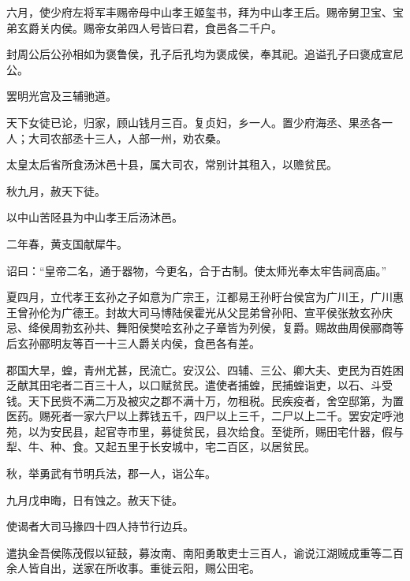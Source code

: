 \documentclass[12pt,UTF8]{ctexbook}
\begin{document}
六月，使少府左将军丰赐帝母中山孝王姬玺书，拜为中山孝王后。赐帝舅卫宝、宝弟玄爵关内侯。赐帝女弟四人号皆曰君，食邑各二千户。



封周公后公孙相如为褒鲁侯，孔子后孔均为褒成侯，奉其祀。追谥孔子曰褒成宣尼公。



罢明光宫及三辅驰道。



天下女徒已论，归家，顾山钱月三百。复贞妇，乡一人。置少府海丞、果丞各一人；大司农部丞十三人，人部一州，劝农桑。



太皇太后省所食汤沐邑十县，属大司农，常别计其租入，以赡贫民。



秋九月，赦天下徒。



以中山苦陉县为中山孝王后汤沐邑。



二年春，黄支国献犀牛。



诏曰：“皇帝二名，通于器物，今更名，合于古制。使太师光奉太牢告祠高庙。”



夏四月，立代孝王玄孙之子如意为广宗王，江都易王孙盱台侯宫为广川王，广川惠王曾孙伦为广德王。封故大司马博陆侯霍光从父昆弟曾孙阳、宣平侯张敖玄孙庆忌、绛侯周勃玄孙共、舞阳侯樊哙玄孙之子章皆为列侯，复爵。赐故曲周侯郦商等后玄孙郦明友等百一十三人爵关内侯，食邑各有差。



郡国大旱，蝗，青州尤甚，民流亡。安汉公、四辅、三公、卿大夫、吏民为百姓困乏献其田宅者二百三十人，以口赋贫民。遣使者捕蝗，民捕蝗诣吏，以石、斗受钱。天下民赀不满二万及被灾之郡不满十万，勿租税。民疾疫者，舍空邸第，为置医药。赐死者一家六尸以上葬钱五千，四尸以上三千，二尸以上二千。罢安定呼池苑，以为安民县，起官寺市里，募徙贫民，县次给食。至徙所，赐田宅什器，假与犁、牛、种、食。又起五里于长安城中，宅二百区，以居贫民。



秋，举勇武有节明兵法，郡一人，诣公车。



九月戊申晦，日有蚀之。赦天下徒。



使谒者大司马掾四十四人持节行边兵。



遣执金吾侯陈茂假以钲鼓，募汝南、南阳勇敢吏士三百人，谕说江湖贼成重等二百余人皆自出，送家在所收事。重徙云阳，赐公田宅。
\end{document}
